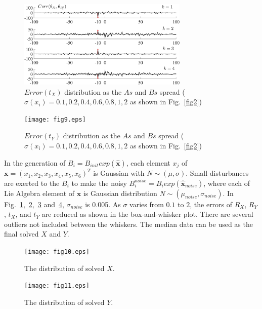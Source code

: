 \documentclass[letterpaper, 10 pt, conference]{ieeeconf}  %
\begin{document}
\begin{center}
\begin{figure}
\centering
\includegraphics[width=3.2in]{fig8.eps}
\caption{
$Error(t_X)$ distribution as the $As$ and $Bs$ spread ($\sigma(x_i) = 0.1, 0.2, 0.4, 0.6, 0.8, 1, 2$ as shown in Fig.~\ref{fig2})
}
\label{fig8}
\end{figure}
\end{center}

\begin{center}
\begin{figure}
\centering
\texttt{[image: fig9.eps]}
\caption{
$Error(t_Y)$ distribution as the $As$ and $Bs$ spread ($\sigma(x_i) = 0.1, 0.2, 0.4, 0.6, 0.8, 1, 2$ as shown in Fig.~\ref{fig2})
}
\label{fig9}
\end{figure}
\end{center}


In the generation of $B_i = B_{init} exp(\mathbf{\widehat{x}})$, each element $x_j$ of $\mathbf{x} = (x_1,x_2,x_3,x_4,x_5,x_6)^T $ is Gaussian with $N \sim (\mu,\sigma)$. Small disturbances are exerted to the $B_i$ to make the noisy $B_i^{noise} = B_i exp(\mathbf{\widehat{x}}_{noise})$, where each of Lie Algebra element of $\mathbf{x}$ is Gaussian distribution $N \sim (\mu_{noise},\sigma_{noise})$. In Fig.~\ref{fig8},~\ref{fig9},~\ref{fig10} and~\ref{fig11}, $\sigma_{noise}$ is 0.005. As $\sigma$ varies from $0.1$ to $2$, the errors of $R_X$, $R_Y$, $t_X$, and $t_Y$ are reduced as shown in the box-and-whisker plot. There are several outliers not included between the whiskers. The median data can be used as the final solved $X$ and $Y$.



\begin{center}
\begin{figure}
\centering
\texttt{[image: fig10.eps]}
\caption{
The distribution of solved $X$.
}
\label{fig10}
\end{figure}
\end{center}

\begin{center}
\begin{figure}
\centering
\texttt{[image: fig11.eps]}
\caption{
The distribution of solved $Y$.
}
\label{fig11}
\end{figure}
\end{center}
\end{document}
